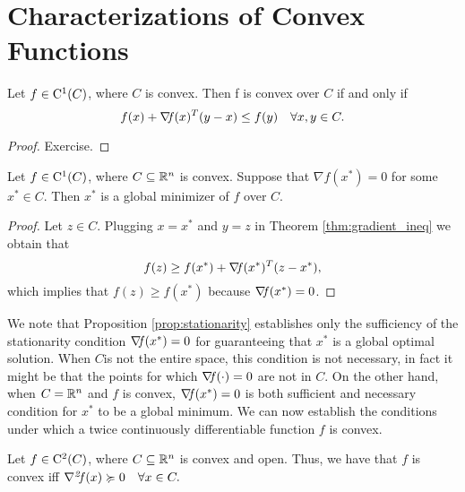 \documentclass[10pt,a4paper]{article}
\begin{document}
\section{Characterizations of Convex Functions}
\begin{theorem}\label{thm:gradient_ineq}
	Let $f\in \mathord{\mathrm{C^1}}(C)$, where $C$ is convex. Then f is convex over $C$ if and only if
	\begin{equation}\label{eq:grad_ineq}
		f(x) +\operatorname*{\mathit{\nabla \!f}}(x)^T(y-x)\leq f(y) \quad \forall x, y\in C.
	\end{equation}
\end{theorem}
\begin{proof}
	Exercise.
\end{proof}
\begin{proposition}\label{prop:stationarity}
	Let $f\in \mathord{\mathrm{C^1}}(C)$, where $C\subseteq\mathbb{R}^n$ is convex. Suppose that $\nabla f(x^*)=0$ for some $x^*\in C$. Then $x^*$ is a global minimizer of $f$ over $C$.
\end{proposition}
\begin{proof}
	Let $z\in C$. Plugging $x=x^*$ and $y=z$ in Theorem \ref{thm:gradient_ineq} we obtain that 
	\begin{equation*}
		f(z)\geq f(x^*) +\operatorname*{\mathit{\nabla \!f}}(x^*)^T(z-x^*),
	\end{equation*}
which implies that $f(z)\geq f(x^*) $ because $\operatorname*{\mathit{\nabla \!f}}(x^*)=0$.
\end{proof}
We note that Proposition \ref{prop:stationarity} establishes only the sufficiency of the stationarity condition $\operatorname*{\mathit{\nabla \!f}}(x^*) = 0$ for guaranteeing that $x^*$ is a global optimal solution. When $C$is not the
entire space, this condition is not necessary, in fact it might be that the points for which $\operatorname*{\mathit{\nabla \!f}}(\cdot)=0$ are not in $C$. On the other hand, when $C=\mathbb{R}^n$ and $f$ is convex, $\operatorname*{\mathit{\nabla \!f}}(x^*) = 0$ is both sufficient and necessary condition for $x^*$ to be a global minimum.
We can now establish the conditions under which a twice continuously differentiable function $f$ is convex.
\begin{theorem}
	Let $f\in \mathord{\mathrm{C^2}}(C)$, where $C\subseteq\mathbb{R}^n$ is convex and open. Thus, we have that $f$ is convex iff $\operatorname*{\mathit{\nabla^2 \!f}}(x)\succcurlyeq0\quad \forall x\in C.$
\end{theorem}
\end{document}
